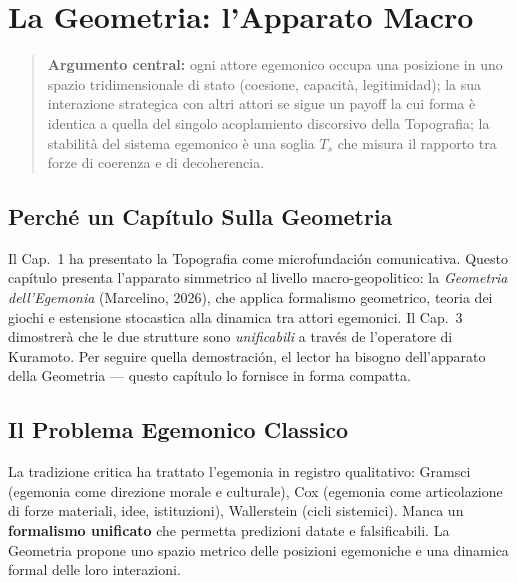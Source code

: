 \chapter{La Geometria: l'Apparato
Macro}\label{la-geometria-lapparato-macro}

\begin{quote}
\textbf{Argumento central:} ogni attore egemonico occupa una posizione
in uno spazio tridimensionale di stato (coesione, capacità,
legitimidad); la sua interazione strategica con altri attori se sigue un
payoff la cui forma è identica a quella del singolo acoplamiento
discorsivo della Topografia; la stabilità del sistema egemonico è una
soglia \(T_s\) che misura il rapporto tra forze di coerenza e di
decoherencia.
\end{quote}



\section{Perché un Capítulo Sulla
Geometria}\label{perchuxe9-un-capítulo-sulla-geometria}

Il Cap.~1 ha presentato la Topografia come microfundación comunicativa.
Questo capítulo presenta l'apparato simmetrico al livello
macro-geopolitico: la \emph{Geometria dell'Egemonia} (Marcelino, 2026),
che applica formalismo geometrico, teoria dei giochi e estensione
stocastica alla dinamica tra attori egemonici. Il Cap.~3 dimostrerà che
le due strutture sono \emph{unificabili} a través de l'operatore di
Kuramoto. Per seguire quella demostración, el lector ha bisogno
dell'apparato della Geometria --- questo capítulo lo fornisce in forma
compatta.



\section{Il Problema Egemonico
Classico}\label{il-problema-egemonico-classico}

La tradizione critica ha trattato l'egemonia in registro qualitativo:
Gramsci (egemonia come direzione morale e culturale), Cox (egemonia come
articolazione di forze materiali, idee, istituzioni), Wallerstein (cicli
sistemici). Manca un \textbf{formalismo unificato} che permetta
predizioni datate e falsificabili. La Geometria propone uno spazio
metrico delle posizioni egemoniche e una dinamica formal delle loro
interazioni.



